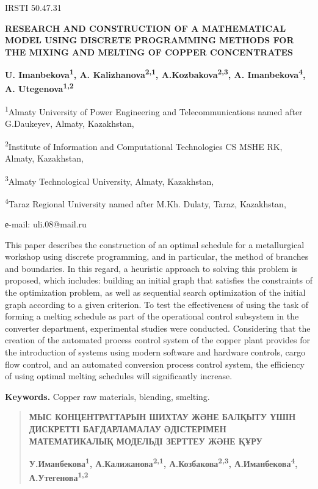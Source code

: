 IRSTI 50.47.31

\textbf{RESEARCH AND CONSTRUCTION OF A MATHEMATICAL MODEL USING DISCRETE
PROGRAMMING METHODS FOR THE MIXING AND MELTING OF COPPER CONCENTRATES}

\textbf{U. Imanbekova\textsuperscript{1}, A.
Kalizhanova\textsuperscript{2,1}, A.Kozbakova\textsuperscript{2,3}, A.
Imanbekova\textsuperscript{4}, A. Utegenova\textsuperscript{1,2}}

\textsuperscript{1}Almaty University of Power Engineering and
Telecommunications named after G.Daukeyev, Almaty, Kazakhstan,

\textsuperscript{2}Institute of Information and Computational
Technologies CS MSHE RK, Almaty, Kazakhstan,

\textsuperscript{3}Almaty Technological University, Almaty, Kazakhstan,

\textsuperscript{4}Taraz Regional University named after M.Kh. Dulaty,
Taraz, Kazakhstan,

е-mail: uli.08@mail.ru

This paper describes the construction of an optimal schedule for a
metallurgical workshop using discrete programming, and in particular,
the method of branches and boundaries. In this regard, a heuristic
approach to solving this problem is proposed, which includes: building
an initial graph that satisfies the constraints of the optimization
problem, as well as sequential search optimization of the initial graph
according to a given criterion. To test the effectiveness of using the
task of forming a melting schedule as part of the operational control
subsystem in the converter department, experimental studies were
conducted. Considering that the creation of the automated process
control system of the copper plant provides for the introduction of
systems using modern software and hardware controls, cargo flow control,
and an automated conversion process control system, the efficiency of
using optimal melting schedules will significantly increase.

\textbf{Keywords.} Copper raw materials, blending, smelting.

\begin{quote}
\textbf{МЫС КОНЦЕНТРАТТАРЫН ШИХТАУ ЖӘНЕ БАЛҚЫТУ ҮШІН ДИСКРЕТТІ
БАҒДАРЛАМАЛАУ ӘДІСТЕРІМЕН МАТЕМАТИКАЛЫҚ МОДЕЛЬДІ ЗЕРТТЕУ ЖӘНЕ ҚҰРУ}

\textbf{У.Иманбекова\textsuperscript{1},
А.Калижанова\textsuperscript{2,1}, А.Козбакова\textsuperscript{2,3},
А.Иманбекова\textsuperscript{4}, А.Утегенова\textsuperscript{1,2}}
\end{quote}

